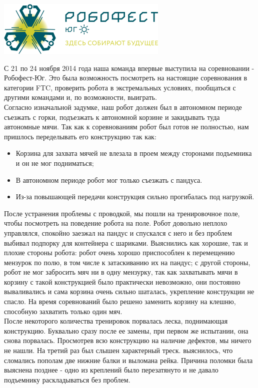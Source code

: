 ﻿\begin{center}
	\includegraphics{Days/21-24.11.14/robofest_logo.png}
\end{center}
С 21 по 24 ноября 2014 года наша команда впервые выступила на соревновании - Робофест-Юг. Это была возможность посмотреть на настоящие соревнования в категории FTC, проверить робота в экстремальных условиях, пообщаться с другими командами и, по возможности, выиграть.\\
Согласно изначальной задумке, наш робот должен был в автономном периоде съезжать с горки, подъезжать к автономной корзине и закидывать туда автономные мячи. Так как к соревнованиям робот был готов не полностью, нам пришлось переделывать его конструкцию так как:
\begin{itemize}
	\item Корзина для захвата мячей не влезала в проем между сторонами подъемника и он не мог подниматься;
	\item В автономном периоде робот мог только съезжать с пандуса.
	\item Из-за повышающей передачи конструкция сильно прогибалась под нагрузкой.
\end{itemize}
После устранения проблемы с проводкой, мы пошли на тренировочное поле, чтобы посмотреть на поведение робота на поле. Робот довольно неплохо управлялся, спокойно заезжал на пандус и спускался с него и без проблем выбивал подпорку для контейнера с шариками. Выяснились как хорошие, так и плохие стороны робота: робот очень хорошо приспособлен к перемещению мензурок по полю, в том числе к затаскиванию их на пандус; с другой стороны, робот не мог забросить мяч ни в одну мензурку, так как захватывать мячи в корзину с такой конструкцией было практически невозможно, они постоянно вываливались и сама корзина очень сильно шаталась, укрепление конструкции не спасло. На время соревнований было решено заменить корзину на клешню, способную захватить только один мяч. \\
После некоторого количества тренировок порвалась леска, поднимающая конструкцию. Буквально сразу после ее замены, при первом же испытании, она снова порвалась. Просмотрев всю конструкцию на наличие дефектов, мы ничего не нашли. На третий раз был слышен характерный треск. выяснилось, что сломались пополам две нижние балки и выломана рейка. Причина поломки была выяснена позднее - одно из креплений было перезатянуто и не давало подъемнику раскладываться без проблем. \\
